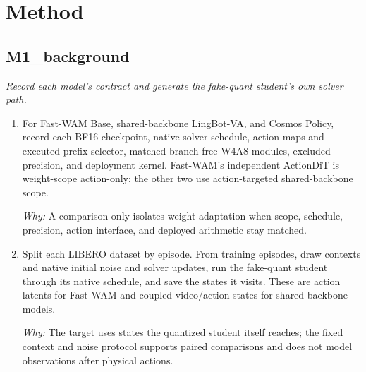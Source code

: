 \documentclass[10pt,a4paper]{article}
\begin{document}
\section*{Method}
\subsection*{M1\_background}
\emph{Record each model's contract and generate the fake-quant student's own solver path.}
\begin{enumerate}[leftmargin=*,start=1]
  \item For Fast-WAM Base, shared-backbone LingBot-VA, and Cosmos Policy, record each BF16 checkpoint, native solver schedule, action maps and executed-prefix selector, matched branch-free W4A8 modules, excluded precision, and deployment kernel. Fast-WAM's independent ActionDiT is weight-scope action-only;\allowbreak{} the other two use action-targeted shared-backbone scope.
\par\emph{Why:} A comparison only isolates weight adaptation when scope, schedule, precision, action interface, and deployed arithmetic stay matched.
  \item Split each LIBERO dataset by episode. From training episodes, draw contexts and native initial noise and solver updates, run the fake-quant student through its native schedule, and save the states it visits. These are action latents for Fast-WAM and coupled video/action states for shared-backbone models.
\par\emph{Why:} The target uses states the quantized student itself reaches;\allowbreak{} the fixed context and noise protocol supports paired comparisons and does not model observations after physical actions.
\end{enumerate}
\end{document}
